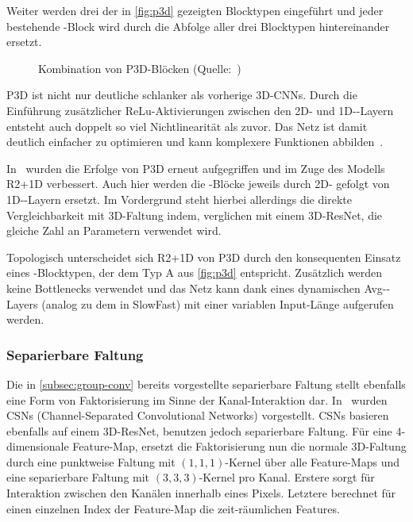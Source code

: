 Weiter werden drei der in \autoref{fig:p3d} gezeigten Blocktypen eingeführt und jeder bestehende \res-Block wird durch die Abfolge aller drei Blocktypen hintereinander ersetzt.

\begin{figure}[h!]
    \centering
    \caption[Kombination von P3D-Blöcken]{Kombination von P3D-Blöcken (Quelle:~\cite{Qiu17})}
    \label{fig:p3d}
\end{figure}

P3D ist nicht nur deutliche schlanker als vorherige 3D-CNNs.
Durch die Einführung zusätzlicher ReLu-Aktivierungen zwischen den 2D- und 1D-\conv-Layern entsteht auch doppelt so viel Nichtlinearität als zuvor.
Das Netz ist damit deutlich einfacher zu optimieren und kann komplexere Funktionen abbilden~\cite{Tran18}.

In~\cite{Tran18} wurden die Erfolge von P3D erneut aufgegriffen und im Zuge des Modells R2+1D verbessert.
Auch hier werden die \res-Blöcke jeweils durch 2D- gefolgt von 1D-\conv-Layern ersetzt.
Im Vordergrund steht hierbei allerdings die direkte Vergleichbarkeit mit 3D-Faltung indem, verglichen mit einem 3D-ResNet, die gleiche Zahl an Parametern verwendet wird.

Topologisch unterscheidet sich R2+1D von P3D durch den konsequenten Einsatz eines \res-Blocktypen, der dem Typ A aus \autoref{fig:p3d} entspricht.
Zusätzlich werden keine Bottlenecks verwendet und das Netz kann dank eines dynamischen Avg-\pool-Layers (analog zu dem in SlowFast) mit einer variablen Input-Länge aufgerufen werden.

\subsubsection{Separierbare Faltung}

Die in \autoref{subsec:group-conv} bereits vorgestellte separierbare Faltung stellt ebenfalls eine Form von Faktorisierung im Sinne der Kanal-Interaktion dar.
In~\cite{Tran19} wurden CSNs (Channel-Separated Convolutional Networks) vorgestellt.
CSNs basieren ebenfalls auf einem 3D-ResNet, benutzen jedoch separierbare Faltung.
Für eine 4-dimensionale Feature-Map, ersetzt die Faktorisierung nun die normale 3D-Faltung durch eine punktweise Faltung mit $(1, 1, 1)$-Kernel über alle Feature-Maps und eine separierbare Faltung mit $(3, 3, 3)$-Kernel pro Kanal.
Erstere sorgt für Interaktion zwischen den Kanälen innerhalb eines Pixels.
Letztere berechnet für einen einzelnen Index der Feature-Map die zeit-räumlichen Features.

